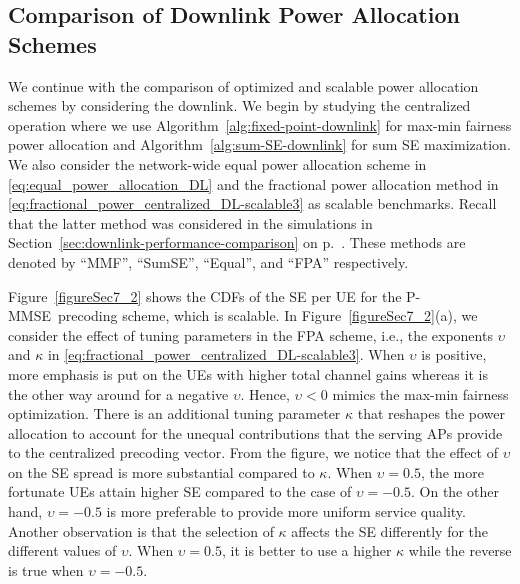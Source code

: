 \subsection{Comparison of Downlink Power Allocation Schemes}

We continue with the comparison of optimized and scalable power allocation schemes by considering the downlink. We begin by studying the centralized operation where we use Algorithm~\ref{alg:fixed-point-downlink} for max-min fairness power allocation and Algorithm~\ref{alg:sum-SE-downlink} for sum SE maximization. We also consider the network-wide equal power allocation scheme in \eqref{eq:equal_power_allocation_DL} and the fractional power allocation method in \eqref{eq:fractional_power_centralized_DL-scalable3} as scalable benchmarks. Recall that the latter method was considered in the simulations in Section~\ref{sec:downlink-performance-comparison} on p.~\pageref{sec:downlink-performance-comparison}. These methods are denoted by ``MMF'', ``SumSE'', ``Equal'', and ``\gls{FPA}'' respectively. 


Figure~\ref{figureSec7_2} shows the CDFs of the SE per UE for the P-MMSE~precoding scheme, which is scalable. In Figure~\ref{figureSec7_2}(a), we consider the effect of tuning parameters in the FPA scheme, i.e., the exponents $\upsilon$ and $\kappa$ in \eqref{eq:fractional_power_centralized_DL-scalable3}. When $\upsilon$ is positive, more emphasis is put on the UEs with higher total channel gains whereas it is the other way around for a negative $\upsilon$. Hence, $\upsilon<0$ mimics the max-min fairness optimization. There is an additional tuning parameter $\kappa$ that reshapes the power allocation to account for the unequal contributions that the serving APs provide to the centralized precoding vector. From the figure, we notice that the effect of $\upsilon$ on the SE spread is more substantial compared to $\kappa$. When $\upsilon=0.5$, the more fortunate UEs attain higher SE compared to the case of $\upsilon=-0.5$. On the other hand, $\upsilon=-0.5$ is more preferable to provide more uniform service quality. Another observation is that the selection of $\kappa$ affects the SE differently for the different values of $\upsilon$. When $\upsilon=0.5$, it is better to use a higher $\kappa$ while the reverse is true when $\upsilon=-0.5$. 


